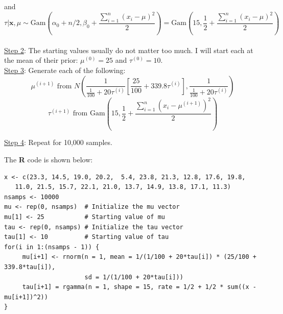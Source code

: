 \documentclass[11pt]{article}
\begin{document}
and\\
$\tau|\boldsymbol{x},\mu\sim\text{Gam}\left(\alpha_0+n/2,\beta_0+\dfrac{\sum_{i=1}^n(x_i-\mu)^2}{2}\right)=\text{Gam}\left(15,\dfrac{1}{2}+\dfrac{\sum_{i=1}^n(x_i-\mu)^2}{2}\right)$\\ \\

\uline{Step 2}: The starting values usually do not matter too much. I will start each at the mean of their prior: $\mu^{(0)}=25$ and $\tau^{(0)}=10$.\\

\uline{Step 3}: Generate each of the following:
$$
\mu^{(i+1)} \text{ from } N\left(\dfrac{1}{\frac{1}{100}+20\tau^{(i)}}\left[\dfrac{25}{100}+339.8\tau^{(i)}\right],\dfrac{1}{\frac{1}{100}+20\tau^{(i)}}\right)
$$
$$
\tau^{(i+1)} \text{ from } \text{Gam}\left(15,\dfrac{1}{2}+\dfrac{\sum_{i=1}^n(x_i-\mu^{(i+1)})^2}{2}\right)
$$

\vspace{-.1in}

\uline{Step 4}: Repeat for 10,000 samples.

The {\bf R} code is shown below:
\begin{verbatim}
x <- c(23.3, 14.5, 19.0, 20.2,  5.4, 23.8, 21.3, 12.8, 17.6, 19.8,
   11.0, 21.5, 15.7, 22.1, 21.0, 13.7, 14.9, 13.8, 17.1, 11.3)
nsamps <- 10000
mu <- rep(0, nsamps)  # Initialize the mu vector
mu[1] <- 25           # Starting value of mu
tau <- rep(0, nsamps) # Initialize the tau vector
tau[1] <- 10          # Starting value of tau
for(i in 1:(nsamps - 1)) {
     mu[i+1] <- rnorm(n = 1, mean = 1/(1/100 + 20*tau[i]) * (25/100 + 339.8*tau[i]),
                      sd = 1/(1/100 + 20*tau[i]))
     tau[i+1] = rgamma(n = 1, shape = 15, rate = 1/2 + 1/2 * sum((x - mu[i+1])^2))
}
\end{verbatim}

\vspace{-.2in}
\end{document}
